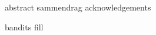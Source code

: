 \documentclass[
    10pt,
    b5paper,
    openright,
]{report} %
\begin{document}

{abstract}
{sammendrag}
{acknowledgements}


\setcounter{tocdepth}{2}
\tableofcontents
\cleardoublepage


{bandits}
{fill}
\end{document}
